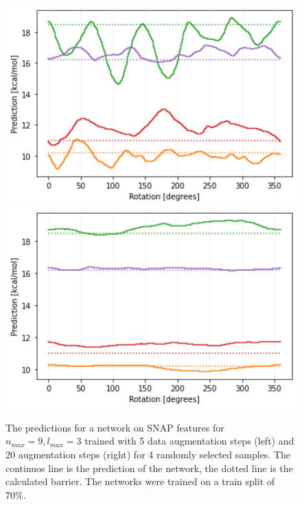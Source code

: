 \begin{figure}[!htb]
  \centering
    \includegraphics[width=1.0\textwidth]{figures/regression/snap/aug-5steps-30per.png}
  \endminipage\hfill
  \includegraphics[width=1.0\textwidth]{figures/regression/snap/aug-30steps-30per.png}
  \endminipage
  \caption[Evaluation of SNAP rotational invariance]{
  The predictions for a network on SNAP features for $n_{max}=9, l_{max}=3$ trained with 5 data augmentation steps (left) 
  and 20 augmentation steps (right) for 4 randomly selected samples. 
  The continuos line is the prediction of the network, the dotted line is the calculated barrier.
  The networks were trained on a train split of 70\%.
  }
  \label{fig:snap_roation}

\end{figure}


